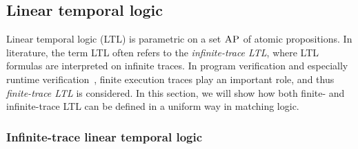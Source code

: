 \documentclass{amsart}
\begin{document}
\subsection{Linear temporal logic}
\label{sec_LTL}


Linear temporal logic (LTL) is parametric 
on a set $\textsc{AP}$ of atomic propositions.
In literature, the term LTL often refers to the \emph{infinite-trace LTL},
where LTL formulas are interpreted on infinite traces.
In program verification and especially runtime verification~\cite{bibid},
finite execution traces play an important role, and thus
\emph{finite-trace LTL} is considered.
In this section, we will show how
both finite- and infinite-trace LTL can be defined in a uniform way in matching logic.

\subsubsection{Infinite-trace linear temporal logic}
\end{document}
